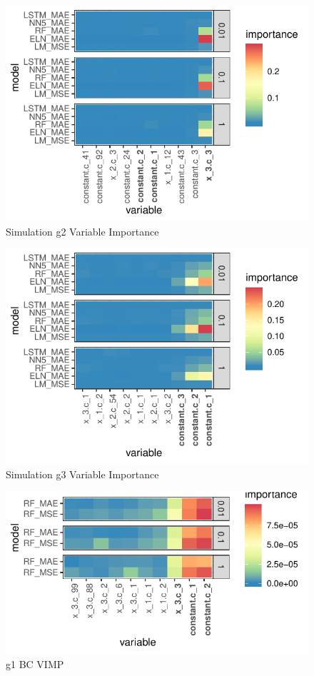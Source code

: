 \documentclass[11pt, a4paper, table]{article}
\begin{document}
\begin{figure}
	\includegraphics[]{../Results/simulation/graphics/simulation_g2_vi.pdf}
	\caption{Simulation g2 Variable Importance}
\end{figure}

\begin{figure}
	\includegraphics[]{../Results/simulation/graphics/simulation_g3_vi.pdf}
 	\caption{Simulation g3 Variable Importance}
\end{figure}


\begin{figure}
	\includegraphics[]{../Results/simulation/graphics/simulation_g1_vimp_bc.pdf}
	\caption{g1 BC VIMP}
\end{figure}
\end{document}
